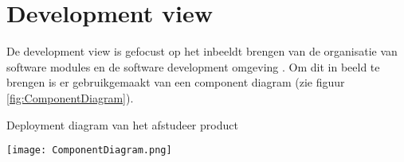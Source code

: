 \section{Development view}
De development view is gefocust op het inbeeldt brengen van de organisatie van software modules en de software development omgeving \parencite{4+1ViewModelPaper}.
Om dit in beeld te brengen is er gebruikgemaakt van een component diagram (zie figuur \ref{fig:ComponentDiagram}).


\whitespace[2]
\begin{graphic}
    \captionsetup{type=figure}
    \caption{Deployment diagram van het afstudeer product}
    \texttt{[image: ComponentDiagram.png]}
    \label{fig:ComponentDiagram}
\end{graphic}


